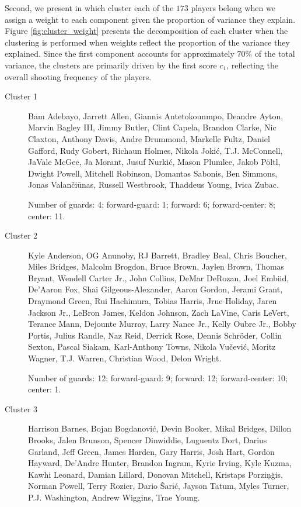 Second, we present in which cluster each of the $173$ players belong when we assign a weight to each component given the proportion of variance they explain. Figure \ref{fig:cluster_weight} presents the decomposition of each cluster when the clustering is performed when weights reflect the proportion of the variance they explained. Since the first component accounts for approximately $70\%$ of the total variance, the clusters are primarily driven by the first score $c_1$, reflecting the overall shooting frequency of the players.


\begin{description}
	\item[Cluster 1] Bam Adebayo, Jarrett Allen, Giannis Antetokounmpo, Deandre Ayton, Marvin Bagley III, Jimmy Butler, Clint Capela, Brandon Clarke, Nic Claxton, Anthony Davis, Andre Drummond, Markelle Fultz, Daniel Gafford, Rudy Gobert, Richaun Holmes, Nikola Jokić, T.J. McConnell, JaVale McGee, Ja Morant, Jusuf Nurkić, Mason Plumlee, Jakob Pöltl, Dwight Powell, Mitchell Robinson, Domantas Sabonis, Ben Simmons, Jonas Valančiūnas, Russell Westbrook, Thaddeus Young, Ivica Zubac.

	      Number of guards: 4; forward-guard: 1; forward: 6; forward-center: 8; center: 11.

	\item[Cluster 2] Kyle Anderson, OG Anunoby, RJ Barrett, Bradley Beal, Chris Boucher, Miles Bridges, Malcolm Brogdon, Bruce Brown, Jaylen Brown, Thomas Bryant, Wendell Carter Jr., John Collins, DeMar DeRozan, Joel Embiid, De'Aaron Fox, Shai Gilgeous-Alexander, Aaron Gordon, Jerami Grant, Draymond Green, Rui Hachimura, Tobias Harris, Jrue Holiday, Jaren Jackson Jr., LeBron James, Keldon Johnson, Zach LaVine, Caris LeVert, Terance Mann, Dejounte Murray, Larry Nance Jr., Kelly Oubre Jr., Bobby Portis, Julius Randle, Naz Reid, Derrick Rose, Dennis Schröder, Collin Sexton, Pascal Siakam, Karl-Anthony Towns, Nikola Vučević, Moritz Wagner, T.J. Warren, Christian Wood, Delon Wright.

	      Number of guards: 12; forward-guard: 9; forward: 12; forward-center: 10; center: 1.

	\item[Cluster 3] Harrison Barnes, Bojan Bogdanović, Devin Booker, Mikal Bridges, Dillon Brooks, Jalen Brunson, Spencer Dinwiddie, Luguentz Dort, Darius Garland, Jeff Green, James Harden, Gary Harris, Josh Hart, Gordon Hayward, De'Andre Hunter, Brandon Ingram, Kyrie Irving, Kyle Kuzma, Kawhi Leonard, Damian Lillard, Donovan Mitchell, Kristaps Porziņģis, Norman Powell, Terry Rozier, Dario Šarić, Jayson Tatum, Myles Turner, P.J. Washington, Andrew Wiggins, Trae Young.


\end{description}
